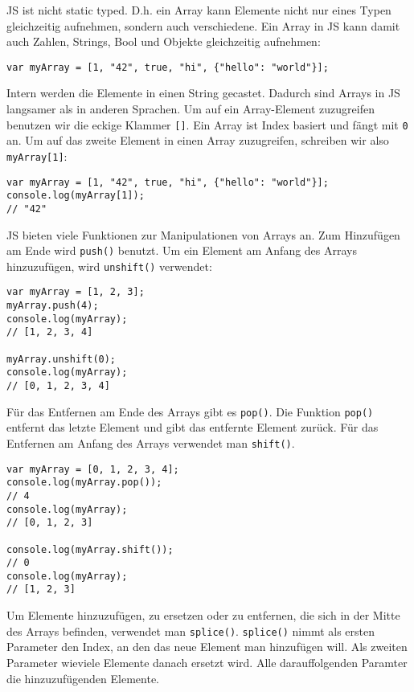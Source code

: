 \documentclass[babel]{book}
\begin{document}
JS ist nicht static typed. D.h. ein Array kann Elemente nicht nur eines Typen gleichzeitig aufnehmen, sondern auch verschiedene. Ein Array in JS kann damit auch Zahlen, Strings, Bool und Objekte gleichzeitig aufnehmen:

\begin{lstlisting}[caption=Array Konstruktor]
var myArray = [1, "42", true, "hi", {"hello": "world"}];
\end{lstlisting}

Intern werden die Elemente in einen String gecastet. Dadurch sind Arrays in JS langsamer als in anderen Sprachen. Um auf ein Array-Element zuzugreifen benutzen wir die eckige Klammer \lstinline|[]|. Ein Array ist Index basiert und fängt mit \lstinline|0| an. Um auf das zweite Element in einen Array zuzugreifen, schreiben wir also \lstinline|myArray[1]|:

\begin{lstlisting}[caption=Array Konstruktor]
var myArray = [1, "42", true, "hi", {"hello": "world"}];
console.log(myArray[1]);
// "42"
\end{lstlisting}

JS bieten viele Funktionen zur Manipulationen von Arrays an.
Zum Hinzufügen am Ende wird \lstinline|push()| benutzt. Um ein Element am Anfang des Arrays hinzuzufügen, wird \lstinline|unshift()| verwendet:

\begin{lstlisting}[caption=Array Konstruktor]
var myArray = [1, 2, 3];
myArray.push(4);
console.log(myArray); 
// [1, 2, 3, 4]

myArray.unshift(0);
console.log(myArray); 
// [0, 1, 2, 3, 4]
\end{lstlisting}

Für das Entfernen am Ende des Arrays gibt es \lstinline|pop()|. Die Funktion \lstinline|pop()| entfernt das letzte Element und gibt das entfernte Element zurück. Für das Entfernen am Anfang des Arrays verwendet man \lstinline|shift()|. 

\begin{lstlisting}[caption=Array Konstruktor]
var myArray = [0, 1, 2, 3, 4];
console.log(myArray.pop());
// 4
console.log(myArray); 
// [0, 1, 2, 3]

console.log(myArray.shift());
// 0
console.log(myArray); 
// [1, 2, 3]
\end{lstlisting}

Um Elemente hinzuzufügen, zu ersetzen oder zu entfernen, die sich in der Mitte des Arrays befinden, verwendet man \lstinline|splice()|. \lstinline|splice()| nimmt als ersten Parameter den Index, an den das neue Element man hinzufügen will. Als zweiten Parameter wieviele Elemente danach ersetzt wird. Alle darauffolgenden Paramter die hinzuzufügenden Elemente. 
\end{document}
